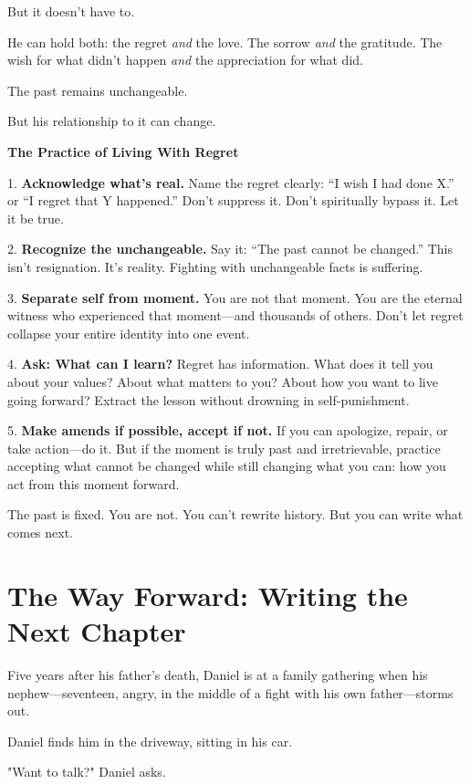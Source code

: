 \documentclass[11pt,twoside]{book}
\begin{document}
But it doesn't have to.

He can hold both: the regret \emph{and} the love. The sorrow \emph{and} the gratitude. The wish for what didn't happen \emph{and} the appreciation for what did.

The past remains unchangeable.

But his relationship to it can change.

\begin{practicebox}
\textbf{The Practice of Living With Regret}

1. \textbf{Acknowledge what's real.} Name the regret clearly: ``I wish I had done X.'' or ``I regret that Y happened.'' Don't suppress it. Don't spiritually bypass it. Let it be true.

2. \textbf{Recognize the unchangeable.} Say it: ``The past cannot be changed.'' This isn't resignation. It's reality. Fighting with unchangeable facts is suffering.

3. \textbf{Separate self from moment.} You are not that moment. You are the eternal witness who experienced that moment—and thousands of others. Don't let regret collapse your entire identity into one event.

4. \textbf{Ask: What can I learn?} Regret has information. What does it tell you about your values? About what matters to you? About how you want to live going forward? Extract the lesson without drowning in self-punishment.

5. \textbf{Make amends if possible, accept if not.} If you can apologize, repair, or take action—do it. But if the moment is truly past and irretrievable, practice accepting what cannot be changed while still changing what you can: how you act from this moment forward.

The past is fixed. You are not. You can't rewrite history. But you can write what comes next.
\end{practicebox}

\section*{The Way Forward: Writing the Next Chapter}

Five years after his father's death, Daniel is at a family gathering when his nephew—seventeen, angry, in the middle of a fight with his own father—storms out.

Daniel finds him in the driveway, sitting in his car.

"Want to talk?" Daniel asks.
\end{document}
